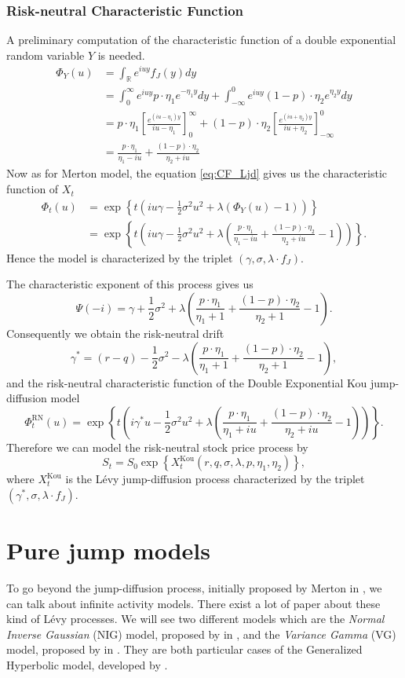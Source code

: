 \subsubsection*{Risk-neutral Characteristic Function}
A preliminary computation of the characteristic function of a double exponential random variable $Y$ is needed.
\begin{align*}
\Phi_Y(u)&=\int_\mathbb{R} e^{iuy}f_J(y) dy\\
&=\int_0^\infty e^{iuy}p\cdot \eta_1e^{-\eta_1 y}dy + \int_{-\infty}^0e^{iuy}(1-p)\cdot\eta_2e^{\eta_2 y}dy\\
&= p\cdot\eta_1\left[\frac{e^{(iu-\eta_1)y}}{iu-\eta_1}\right]_0^\infty+(1-p)\cdot\eta_2\left[\frac{e^{(iu+\eta_2)y}}{iu+\eta_2}\right]_{-\infty}^0\\
&=\frac{p\cdot\eta_1}{\eta_1-iu}+\frac{(1-p)\cdot\eta_2}{\eta_2+iu}
\end{align*}
Now as for Merton model, the equation \eqref{eq:CF_Ljd} gives us the characteristic function of $X_t$
\begin{align*}
\Phi_t(u)&=\exp\left\{t\left(iu\gamma-\frac{1}{2}\sigma^2 u^2 + \lambda\left(\Phi_Y(u)-1\right)\right)\right\}\\
&=\exp\left\{t\left(iu\gamma -\frac{1}{2}\sigma^2u^2 + \lambda\left(\frac{p\cdot\eta_1}{\eta_1-iu}+\frac{(1-p)\cdot\eta_2}{\eta_2+iu}-1\right)\right)\right\}.
\end{align*}
Hence the model is characterized by the triplet $(\gamma,\sigma,\lambda\cdot f_J)$.

The characteristic exponent of this process gives us
$$\Psi(-i) = \gamma + \frac{1}{2}\sigma^2 +\lambda \left(\frac{p\cdot\eta_1}{\eta_1+1}+\frac{(1-p)\cdot\eta_2}{\eta_2+1}-1\right).$$
Consequently we obtain the risk-neutral drift
$$\gamma^\ast = (r-q)- \frac{1}{2}\sigma^2 -\lambda \left(\frac{p\cdot\eta_1}{\eta_1+1}+\frac{(1-p)\cdot\eta_2}{\eta_2+1}-1\right),$$
and the risk-neutral characteristic function of the Double Exponential Kou jump-diffusion model
$$\Phi_t^\text{RN}(u)=\exp\left\{t\left(i\gamma^\ast u -\frac{1}{2}\sigma^2 u^2 +\lambda\left(\frac{p\cdot\eta_1}{\eta_1+iu}+\frac{(1-p)\cdot\eta_2}{\eta_2+iu}-1\right)\right)\right\}.$$
Therefore we can model the risk-neutral stock price process by
$$S_t=S_0\exp\left\{X_t^\text{Kou}(r,q,\sigma,\lambda,p,\eta_1,\eta_2)\right\},$$
where $X_t^\text{Kou}$ is the L\'evy jump-diffusion process characterized by the triplet $(\gamma^\ast,\sigma,\lambda\cdot f_J)$.

\section{Pure jump models}
\label{sec:models:pure_jump}
To go beyond the jump-diffusion process, initially proposed by Merton in \citeyear{Mer76}, we can talk about infinite activity models. There exist a lot of paper about these kind of L\'evy processes. We will see two different models which are the \textit{Normal Inverse Gaussian} (NIG) model, proposed by \citeauthor{Bar97b} in \citeyear{Bar97b}, and the \textit{Variance Gamma} (VG) model, proposed by \citeauthor{MCC98} in \citeyear{MCC98}. They are both particular cases of the Generalized Hyperbolic model, developed by \citeauthor{EP98} \citeyearpar{EP98}.

